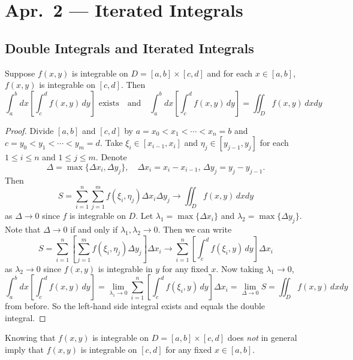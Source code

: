 \chapter{Apr.~2 --- Iterated Integrals}

\section{Double Integrals and Iterated Integrals}
\begin{theorem}
  Suppose $f(x, y)$ is integrable on
  $D = [a, b] \times [c, d]$ and for each $x \in [a, b]$,
  $f(x, y)$ is integrable on $[c, d]$.  Then
  \[
    \int_a^b  dx \left[\int_c^d f(x, y)\, dy\right]
    \text{ exists} \quad \text{and} \quad
    \int_a^b  dx \left[\int_c^d f(x, y)\, dy\right]
    = \iint_D f(x, y)\, dx dy
  \]
\end{theorem}

\begin{proof}
  Divide $[a, b]$ and $[c, d]$ by
  $a = x_0 < x_1 < \cdots < x_n = b$ and
  $c = y_0 < y_1 < \cdots < y_m = d$.
  Take $\xi_i \in [x_{i-1}, x_i]$ and
  $\eta_j \in [y_{j-1}, y_j]$ for each $1 \le i \le n$
  and $1 \le j \le m$. Denote
  \[
    \Delta = \max\{\Delta x_i, \Delta y_j\}, \quad
    \Delta x_i = x_i - x_{i-1},\, \Delta y_j = y_j - y_{j-1}.
  \]
  Then
  \[
    S = \sum_{i = 1}^n \sum_{j = 1}^m f(\xi_i, \eta_j) \Delta x_i \Delta y_j \to \iint_D f(x, y)\, dx dy
  \]
  as $\Delta \to 0$ since $f$ is integrable on $D$.
  Let $\lambda_1 = \max\{\Delta x_i\}$ and
  $\lambda_2 = \max\{\Delta y_j\}$. Note that
  $\Delta \to 0$ if and only if $\lambda_1, \lambda_2 \to 0$.
  Then we can write
  \[
    S = \sum_{i = 1}^n \left[\sum_{j = 1}^m f(\xi_i, \eta_j) \Delta y_j\right] \Delta x_i
    \to \sum_{i = 1}^n \left[\int_c^d f(\xi_i, y)\, dy\right] \Delta x_i
  \]
  as $\lambda_2 \to 0$ since $f(x, y)$ is integrable in
  $y$ for any fixed $x$. Now taking $\lambda_1 \to 0$,
  \[
    \int_a^b  dx \left[\int_c^d f(x, y)\, dy\right]
    = \lim_{\lambda_1 \to 0} \sum_{i = 1}^n \left[\int_c^d f(\xi_i, y)\, dy\right] \Delta x_i
    = \lim_{\Delta \to 0} S = \iint_D f(x, y)\, dx dy
  \]
  from before. So the left-hand side integral exists and
  equals the double integral.
\end{proof}

\begin{remark}
  Knowing that $f(x, y)$ is integrable on
  $D = [a, b] \times [c, d]$ does \emph{not} in
  general imply that
  $f(x, y)$ is integrable on $[c, d]$ for any fixed
  $x \in [a, b]$.
\end{remark}

